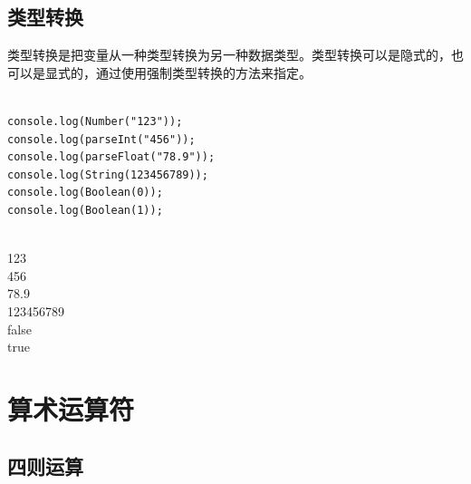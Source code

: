 \subsection{类型转换}

类型转换是把变量从一种类型转换为另一种数据类型。类型转换可以是隐式的，也可以是显式的，通过使用强制类型转换的方法来指定。 \\

 \\

\begin{lstlisting}[style=htmlcssjs]
console.log(Number("123"));
console.log(parseInt("456"));
console.log(parseFloat("78.9"));
console.log(String(123456789));
console.log(Boolean(0));
console.log(Boolean(1));
\end{lstlisting}

\begin{tcolorbox}
	 \\
	123 \\
	456 \\
	78.9 \\
	123456789 \\
	false \\
	true
\end{tcolorbox}

\newpage

\section{算术运算符}

\subsection{四则运算}

\begin{table}[H]
	\centering
	\caption{四则运算}
\end{table}

